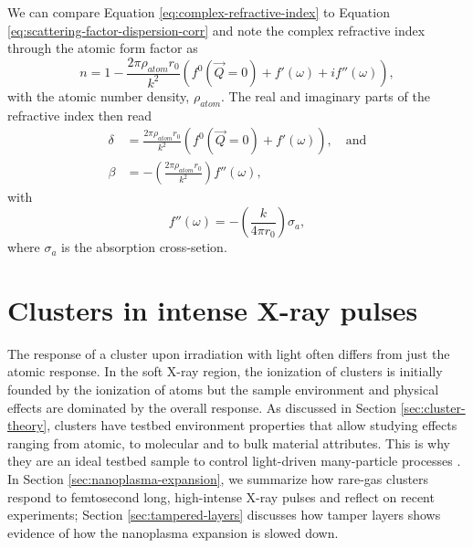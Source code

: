 We can compare Equation \eqref{eq:complex-refractive-index} to Equation \eqref{eq:scattering-factor-dispersion-corr} and note the complex refractive index through the atomic form factor as \citep{Als-Nielson-2011-JWS}
\begin{equation}
n= 1- \frac{2\pi \rho_{atom}r_{0}}{k^{2}}\left(f^{0}\left(\vec{Q}=0\right)+f'\left(\omega\right)+i f''\left(\omega\right)\right),
\label{eq:eq:complex-refractive-index-atomic-factors}
\end{equation}
with the atomic number density, $\rho_{atom}$. The real and imaginary parts of the refractive index then read
\begin{align}
\delta &= \frac{2 \pi \rho_{atom} r_{0}}{k^{2}}\left(f^{0}\left(\vec{Q}=0\right)+f'\left(\omega\right)\right),\quad \text{and}\\
\beta &= - \left(\frac{2\pi \rho_{atom}r_{0}}{k^{2}}\right)f''\left(\omega\right),
\label{eq:delta-and-beta}
\end{align}
with
\begin{equation}
f''\left(\omega\right)=-\left(\frac{k}{4\pi r_{0}}\right)\sigma_{a},
\label{eq:f-2-definition}
\end{equation}
where $\sigma_{a}$ is the absorption cross-setion.
%
%
%
%
%
%
%
\section{Clusters in intense X-ray pulses}\label{sec:ionizatin-of-ext-obj}
The response of a cluster upon irradiation with light often differs from just the atomic response. In the soft X-ray region, the ionization of clusters is initially founded by the ionization of atoms but the sample environment and physical effects are dominated by the overall response. As discussed in Section \ref{sec:cluster-theory}, clusters have testbed environment properties that allow studying effects ranging from atomic, to molecular and to bulk material attributes. This is why they are an ideal testbed sample to control light-driven many-particle processes \citep{Fennel-2010-RMP}. In Section \ref{sec:nanoplasma-expansion}, we summarize how rare-gas clusters respond to femtosecond long, high-intense X-ray pulses and reflect on recent experiments; Section \ref{sec:tampered-layers} discusses how tamper layers shows evidence of how the nanoplasma expansion is slowed down.
%
%
%
